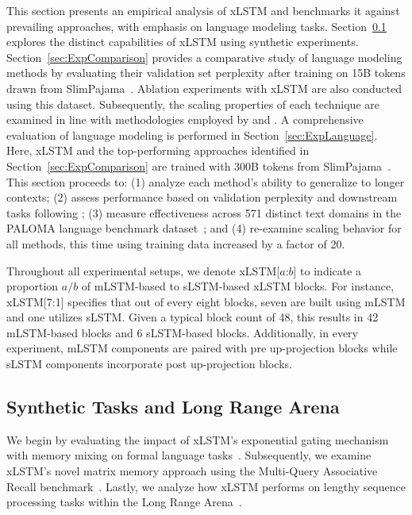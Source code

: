This section presents an empirical analysis of xLSTM and benchmarks it against prevailing approaches, with emphasis on language modeling tasks. Section~\ref{sec:ExpSyntethic} explores the distinct capabilities of xLSTM using synthetic experiments. 
Section~\ref{sec:ExpComparison} provides a comparative study of language modeling methods by evaluating their validation set perplexity after training on 15B tokens drawn from SlimPajama~\citep{Soboleva:23}. Ablation experiments with xLSTM are also conducted using this dataset. Subsequently, the scaling properties of each technique are examined in line with methodologies employed by \citet{Kaplan:20} and \citet{Brown:20short}.
A comprehensive evaluation of language modeling is performed in Section~\ref{sec:ExpLanguage}. Here, xLSTM and the top-performing approaches identified in Section~\ref{sec:ExpComparison} are trained with 300B tokens from SlimPajama~\citep{Soboleva:23}. This section proceeds to: (1) analyze each method's ability to generalize to longer contexts; (2) assess performance based on validation perplexity and downstream tasks following \citep{Sutawika:24}; (3) measure effectiveness across 571 distinct text domains in the PALOMA language benchmark dataset~\citep{Magnusson:23arxivshort}; and (4) re-examine scaling behavior for all methods, this time using training data increased by a factor of 20.

\label{sec:xlstm_blocks_notation}
Throughout all experimental setups, we denote xLSTM[$a$:$b$] to indicate a proportion $a/b$ of mLSTM-based to sLSTM-based xLSTM blocks. For instance, xLSTM[7:1] specifies that out of every eight blocks, seven are built using mLSTM and one utilizes sLSTM. Given a typical block count of 48, this results in 42 mLSTM-based blocks and 6 sLSTM-based blocks. Additionally, in every experiment, mLSTM components are paired with pre up-projection blocks while sLSTM components incorporate post up-projection blocks.

\subsection{Synthetic Tasks and Long Range Arena}
\label{sec:ExpSyntethic}
We begin by evaluating the impact of xLSTM's exponential gating mechanism with memory mixing on formal language tasks~\citep{Deletang:23}. Subsequently, we examine xLSTM's novel matrix memory approach using the Multi-Query Associative Recall benchmark~\citep{Arora:23arxiv}. Lastly, we analyze how xLSTM performs on lengthy sequence processing tasks within the Long Range Arena~\citep{Tay:21}.

